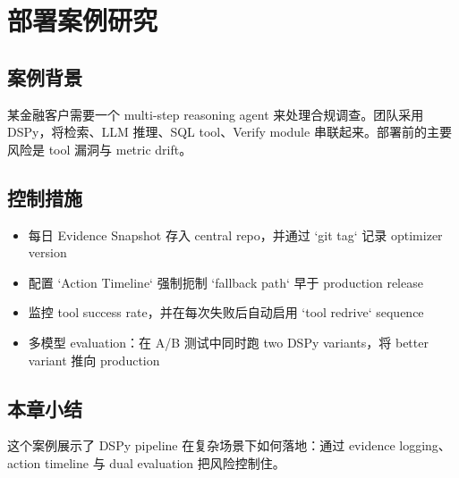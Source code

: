 \section{部署案例研究}

\subsection{案例背景}

某金融客户需要一个 multi-step reasoning agent 来处理合规调查。团队采用 DSPy，将检索、LLM 推理、SQL tool、Verify module 串联起来。部署前的主要风险是 tool 漏洞与 metric drift。

\subsection{控制措施}

\begin{itemize}
    \item 每日 Evidence Snapshot 存入 central repo，并通过 `git tag` 记录 optimizer version
    \item 配置 `Action Timeline` 强制扼制 `fallback path` 早于 production release
    \item 监控 tool success rate，并在每次失败后自动启用 `tool redrive` sequence
    \item 多模型 evaluation：在 A/B 测试中同时跑 two DSPy variants，将 better variant 推向 production
\end{itemize}

\subsection{本章小结}

这个案例展示了 DSPy pipeline 在复杂场景下如何落地：通过 evidence logging、action timeline 与 dual evaluation 把风险控制住。

